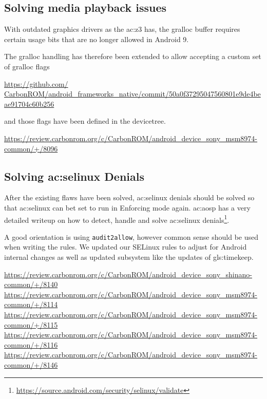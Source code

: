 \subsection{Solving media playback issues}
With outdated graphics drivers as the \acrshort{ac:z3} has, the gralloc buffer requires certain usage bits that are no longer allowed in Android 9.

The gralloc handling has therefore been extended to allow accepting a custom set of gralloc flags

\href{https://github.com/CarbonROM/android_frameworks_native/commit/50a0f37295047560801e9de4beae91704c60b256}{https://github.com/\\CarbonROM/android\_frameworks\_native/commit/50a0f37295047560801e9de4beae91704c60b256}

and those flags have been defined in the devicetree.

\url{https://review.carbonrom.org/c/CarbonROM/android_device_sony_msm8974-common/+/8096}

\subsection{Solving \acrshort{ac:selinux} Denials}
\label{sub:selinux_denials}
After the existing flaws have been solved, \acrshort{ac:selinux} denials should be solved so that \acrshort{ac:selinux} can bet set to run in Enforcing mode again.
\acrshort{ac:aosp} has a very detailed writeup on how to detect, handle and solve \acrshort{ac:selinux} denials\footnote{\url{https://source.android.com/security/selinux/validate}}.

A good orientation is using \texttt{audit2allow}, however common sense should be used when writing the rules. We updated our SELinux rules to adjust for Android internal changes as well as updated subsystem like the updates of \gls{gls:timekeep}.

\url{https://review.carbonrom.org/c/CarbonROM/android_device_sony_shinano-common/+/8140}\\
\url{https://review.carbonrom.org/c/CarbonROM/android_device_sony_msm8974-common/+/8114}\\
\url{https://review.carbonrom.org/c/CarbonROM/android_device_sony_msm8974-common/+/8115}\\
\url{https://review.carbonrom.org/c/CarbonROM/android_device_sony_msm8974-common/+/8116}\\
\url{https://review.carbonrom.org/c/CarbonROM/android_device_sony_msm8974-common/+/8146}


